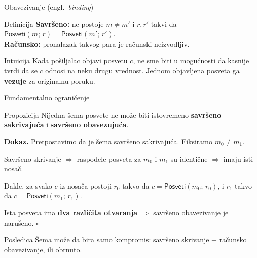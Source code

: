 \documentclass[aspectratio=1610]{beamer}
\newcommand{\keyword}[1]{\textcolor{wcprimary}{\textbf{#1}}}
\begin{document}
\begin{frame}{Obavezivanje \textnormal{(engl.\ \textit{binding})}}
\begin{alertblock}{Definicija}
  \textbf{Savršeno:} ne postoje $m \neq m'$ i $r, r'$ takvi da
  $\mathsf{Posveti}(m;\, r) = \mathsf{Posveti}(m';\, r')$.\\[4pt]
  \textbf{Računsko:} pronalazak takvog para je računski neizvodljiv.
\end{alertblock}

\begin{block}{Intuicija}
  Kada pošiljalac objavi posvetu $c$, ne sme biti u mogućnosti da kasnije
  tvrdi da se $c$ odnosi na neku drugu vrednost. Jednom objavljena posveta
  ga \keyword{vezuje} za originalnu poruku.
\end{block}
\end{frame}

\begin{frame}{Fundamentalno ograničenje}
\begin{block}{Propozicija}
  Nijedna šema posvete ne može biti istovremeno \keyword{savršeno sakrivajuća} i \keyword{savršeno obavezujuća}.
\end{block}

\textbf{Dokaz.} Pretpostavimo da je šema savršeno sakrivajuća. Fiksiramo $m_0 \neq m_1$.

Savršeno skrivanje $\Rightarrow$ raspodele posveta za $m_0$ i $m_1$ su identične $\Rightarrow$ imaju isti nosač.

Dakle, za svako $c$ iz nosača postoji $r_0$ takvo da $c = \mathsf{Posveti}(m_0;\, r_0)$,
i $r_1$ takvo da $c = \mathsf{Posveti}(m_1;\, r_1)$.

Ista posveta ima \keyword{dva različita otvaranja} $\Rightarrow$ savršeno obavezivanje je narušeno. \hfill$\square$


\begin{exampleblock}{Posledica}
  Šema može da bira samo kompromis: savršeno skrivanje + računsko obavezivanje, ili obrnuto.
\end{exampleblock}
\end{frame}

\end{document}
